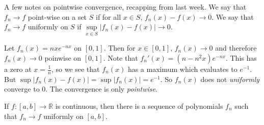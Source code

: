\documentclass[crop=false,class=article,oneside]{standalone}
\begin{document}
            A few notes on pointwise convergence, recapping
            from last week. We say that $f_{n}\rightarrow{f}$
            point-wise on a set $S$ if for all $x\in{S}$,
            $f_{n}(x)-f(x)\rightarrow{0}$. We say that
            $f_{n}\rightarrow{f}$ uniformly on $S$ if
            $\underset{x\in{S}}{\sup}%
             |f_{n}(x)-f(x)|\rightarrow{0}$.
            \begin{example}
                Let $f_{n}(x)=nxe^{-nx}$ on $[0,1]$.
                Then for $x\in[0,1]$, $f_{n}(x)\rightarrow{0}$
                and therefore $f_{n}(x)\rightarrow{0}$ poinwise
                on $[0,1]$. Note that
                $f_{n}'(x)=(n-n^{2}x)e^{-nx}$. This has a
                zero at $x=\frac{1}{n}$, so we see that
                $f_{n}(x)$ has a maximum
                which evaluates to $e^{-1}$. But
                $\sup|f_{n}(x)-f(x)|=\sup|f_{n}(x)|=e^{-1}$.
                So $f_{n}(x)$ does not
                \textit{uniformly} converge to $0$. The
                convergence is only \textit{pointwise}.
            \end{example}
            \begin{theorem}
                If $f:[a,b]\rightarrow\mathbb{R}$ is continuous,
                then there is a sequence of polynomials
                $f_{n}$ such that $f_{n}\rightarrow{f}$
                uniformly on $[a,b]$.
            \end{theorem}
\end{document}
